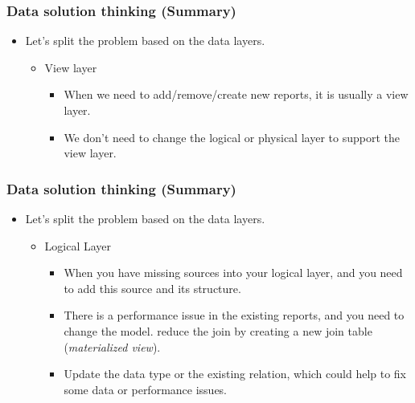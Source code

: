 
\begin{frame}
	\frametitle{Data solution thinking (Summary) }
	\begin{itemize}[<+->]
        \item Let's split the problem based on the data layers.
          \begin{itemize}[<+->]
          \item View layer
            \begin{itemize}[<+->]
            \item When we need to add/remove/create new reports, it is usually a view layer.
            \item We don't need to change the logical or physical layer to support the view layer.
          \end{itemize}
        \end{itemize}
       \end{itemize}
 \end{frame}

\begin{frame}
\frametitle{Data solution thinking (Summary) }
	\begin{itemize}[<+->]
        \item Let's split the problem based on the data layers.
          \begin{itemize}[<+->]
           \item Logical Layer
           \begin{itemize}[<+->]
             \item When you have missing sources into your logical layer, and you need to add this source and its structure.
             \item There is a performance issue in the existing reports, and you need to change the model. \forexample reduce the join by creating a new join table (\textit{materialized view}).
             \item Update the data type or the existing relation, which could help to fix some data or performance issues.
            \end{itemize}
           \end{itemize}
        \end{itemize}
 \end{frame}

